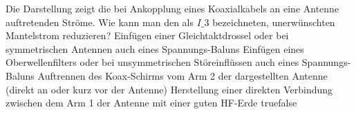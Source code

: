     {Die Darstellung zeigt die bei Ankopplung eines Koaxialkabels an eine Antenne auftretenden Ströme. Wie kann man den als $I\_3$ bezeichneten, unerwünschten Mantelstrom reduzieren?}
    {Einfügen einer Gleichtaktdrossel oder bei symmetrischen Antennen auch eines Spannungs-Baluns}
    {Einfügen eines Oberwellenfilters oder bei unsymmetrischen Störeinflüssen auch eines Spannungs-Baluns}
    {Auftrennen des Koax-Schirms vom Arm 2 der dargestellten Antenne (direkt an oder kurz vor der Antenne)}
    {Herstellung einer direkten Verbindung zwischen dem Arm 1 der Antenne mit einer guten HF-Erde}
    {true}{false}